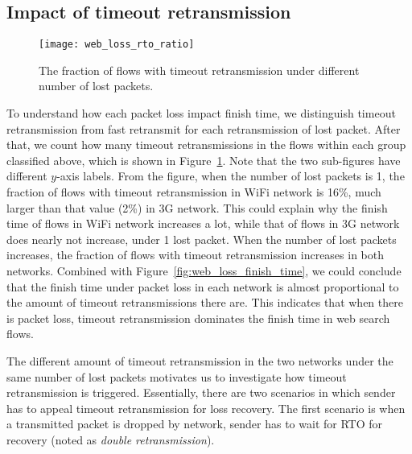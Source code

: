 \subsection{Impact of timeout retransmission}

\begin{figure}[th]
\centering
\texttt{[image: web\_loss\_rto\_ratio]}
\caption{The fraction of flows with timeout retransmission under different number of lost packets.}
\label{fig:web_loss_rto_ratio}
\end{figure}

To understand how each packet loss impact finish time, we distinguish timeout retransmission from fast retransmit for each retransmission of lost packet. After that, we count how many timeout retransmissions in the flows within each group classified above, which is shown in Figure~\ref{fig:web_loss_rto_ratio}. Note that the two sub-figures have different $y$-axis labels. From the figure, when the number of lost packets is 1, the fraction of flows with timeout retransmission in WiFi network is 16\%, much larger than that value (2\%) in 3G network. This could explain why the finish time of flows in WiFi network increases a lot, while that of flows in 3G network does nearly not increase, under 1 lost packet. When the number of lost packets increases, the fraction of flows with timeout retransmission increases in both networks. Combined with Figure~\ref{fig:web_loss_finish_time}, we could conclude that the finish time under packet loss in each network is almost proportional to the amount of timeout retransmissions there are. This indicates that when there is packet loss, timeout retransmission dominates the finish time in web search flows.

The different amount of timeout retransmission in the two networks under the same number of lost packets motivates us to investigate how timeout retransmission is triggered. Essentially, there are two scenarios in which sender has to appeal timeout retransmission for loss recovery. The first scenario is when a transmitted packet is dropped by network, sender has to wait for RTO for recovery (noted as \emph{double retransmission}). 

